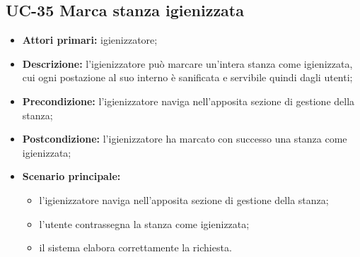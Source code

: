 \subsection{UC-35 Marca stanza igienizzata}

\begin{itemize}
\item \textbf{Attori primari:} igienizzatore;
\item \textbf{Descrizione:} l’igienizzatore può marcare un'intera stanza come igienizzata, cui ogni postazione al suo interno è sanificata e servibile quindi dagli utenti;
\item \textbf{Precondizione:} l'igienizzatore naviga nell’apposita sezione di gestione della stanza; 
\item \textbf{Postcondizione:} l'igienizzatore ha marcato con successo una stanza come igienizzata;
\item \textbf{Scenario principale:} 
	\begin{itemize}
		\item l'igienizzatore naviga nell’apposita sezione di gestione della stanza;	
		\item l'utente contrassegna la stanza come igienizzata;
		\item il sistema elabora correttamente la richiesta.
		\end{itemize}
\end{itemize}


